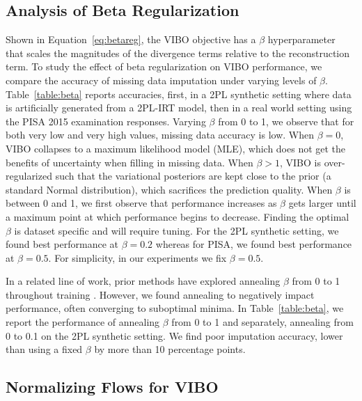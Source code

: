 \subsection{Analysis of Beta Regularization}

Shown in Equation~\ref{eq:betareg}, the VIBO objective has a $\beta$ hyperparameter that scales the magnitudes of the divergence terms relative to the reconstruction term. 
To study the effect of beta regularization on VIBO performance, we compare the accuracy of missing data imputation under varying levels of $\beta$.
Table~\ref{table:beta} reports accuracies, first, in a 2PL synthetic setting where data is artificially generated from a 2PL-IRT model, then in a real world setting using the PISA 2015 examination responses.
Varying $\beta$ from 0 to 1, we observe that for both very low and very high values, missing data accuracy is low. 
When $\beta = 0$, VIBO collapses to a maximum likelihood model (MLE), which does not get the benefits of uncertainty when filling in missing data. 
When $\beta > 1$, VIBO is over-regularized such that the variational posteriors are kept close to the prior (a standard Normal distribution), which sacrifices the prediction quality.
When $\beta$ is between 0 and 1, we first observe that performance increases as $\beta$ gets larger until a maximum point at which performance begins to decrease.
Finding the optimal $\beta$ is dataset specific and will require tuning. For the 2PL synthetic setting, we found best performance at $\beta = 0.2$ whereas for PISA, we found best performance at $\beta = 0.5$.
For simplicity, in our experiments we fix $\beta=0.5$.

In a related line of work, prior methods have explored annealing $\beta$ from 0 to 1 throughout training \cite{kingma2013auto}.
However, we found annealing to negatively impact performance, often converging to suboptimal minima. In Table~\ref{table:beta}, we report the performance of annealing $\beta$ from 0 to 1 and separately, annealing from 0 to 0.1 on the 2PL synthetic setting. 
We find poor imputation accuracy, lower than using a fixed $\beta$ by more than 10 percentage points.

\subsection{Normalizing Flows for VIBO}

